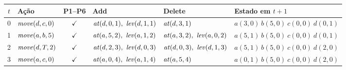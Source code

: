 \begin{longtable}{c p{2.6cm} c p{3.4cm} p{3.4cm} p{3.6cm}}
\toprule $t$ & Ação & P1--P6 & Add & Delete & Estado em $t+1$ \\ \midrule \endhead
0 & $\mathit{move}(d,c,0)$ & $\checkmark$ & $\At(d,0,1),\ \Lev(d,1,1)$ & $\mathit{at}(d,3,1)$ & $a(3,0)\ b(5,0)\ c(0,0)\ d(0,1)$ \\
1 & $\mathit{move}(a,b,5)$ & $\checkmark$ & $\At(a,5,2),\ \Lev(a,1,2)$ & $\At(a,3,2),\ \Lev(a,0,2)$ & $a(5,1)\ b(5,0)\ c(0,0)\ d(0,1)$ \\
2 & $\mathit{move}(d,T,2)$ & $\checkmark$ & $\At(d,2,3),\ \Lev(d,0,3)$ & $\At(d,0,3),\ \Lev(d,1,3)$ & $a(5,1)\ b(5,0)\ c(0,0)\ d(2,0)$ \\
3 & $\mathit{move}(a,c,0)$ & $\checkmark$ & $\At(a,0,4),\ \Lev(a,1,4)$ & $\mathit{at}(a,5,4)$ & $a(0,1)\ b(5,0)\ c(0,0)\ d(2,0)$ \\
\bottomrule \end{longtable}
